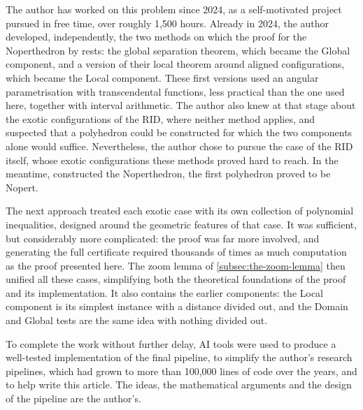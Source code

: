 The author has worked on this problem since 2024, as a self-motivated
project pursued in free time, over roughly 1,500 hours. Already in 2024, the
author developed, independently, the two methods on which the proof for the
Noperthedron by \citet{SteiningerYurkevichNopertV2} rests: the global
separation theorem, which became the Global component, and a version of
their local theorem around aligned configurations, which became the Local
component. These first versions used an angular parametrisation with
transcendental functions, less practical than the one used here, together
with interval arithmetic. The author also knew at that stage about the
exotic configurations of the RID, where neither method applies, and
suspected that a polyhedron could be constructed for which the two
components alone would suffice. Nevertheless, the author chose to pursue
the case of the RID itself, whose exotic configurations these methods proved
hard to reach. In the meantime, \citet{SteiningerYurkevichNopertV2}
constructed the Noperthedron, the first polyhedron proved to be Nopert.

The next approach treated each exotic case with its own collection of
polynomial inequalities, designed around the geometric features of that
case. It was sufficient, but considerably more complicated: the proof was
far more involved, and generating the full certificate required thousands
of times as much computation as the proof presented here. The zoom lemma of
\cref{subsec:the-zoom-lemma} then unified all these
cases, simplifying both the theoretical foundations of the proof and its
implementation. It also contains the earlier components: the Local
component is its simplest instance with a distance divided out, and the
Domain and Global tests are the same idea with nothing divided out.

To complete the work without further delay, AI tools were used to produce
a well-tested implementation of the final pipeline, to simplify the
author's research pipelines, which had grown to more than 100,000 lines of
code over the years, and to help write this article. The ideas, the
mathematical arguments and the design of the pipeline are the author's.
